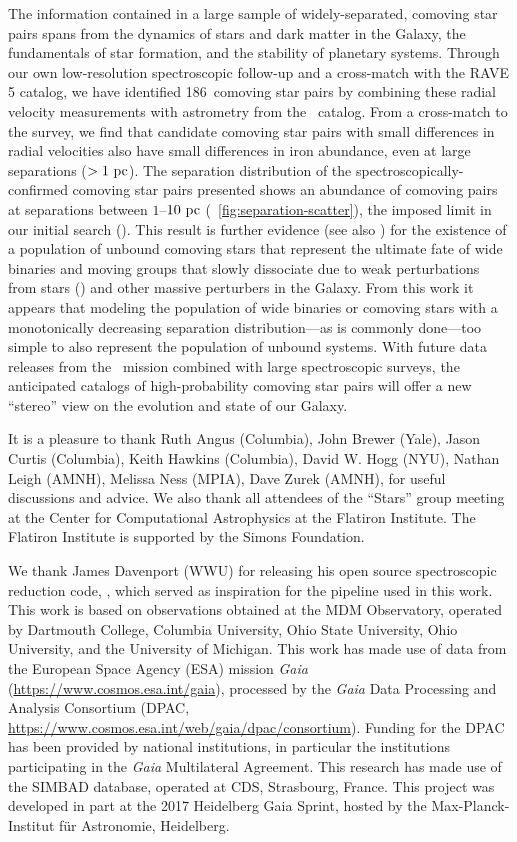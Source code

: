 \documentclass[modern, letterpaper]{aastex61}
\newcommand{\gaia}{\project{Gaia}}
\newcommand{\DR}[1]{\acronym{DR}#1}
\newcommand{\tgas}{\acronym{TGAS}}
\newcommand{\ncomovingtotal}{186}
\begin{document}
The information contained in a large sample of widely-separated, comoving star
pairs spans from the dynamics of stars and dark matter in the Galaxy, the
fundamentals of star formation, and the stability of planetary systems.
Through our own low-resolution spectroscopic follow-up and a cross-match with
the RAVE \DR{5} catalog, we have identified \ncomovingtotal\ comoving star pairs
by combining these radial velocity measurements with astrometry from the \tgas\
catalog.
From a cross-match to the  survey, we find that candidate
comoving star pairs with small differences in radial velocities also have small
differences in iron abundance, even at large separations ($>1~\mathrm{pc}$).
The separation distribution of the spectroscopically-confirmed comoving star
pairs presented shows an abundance of comoving pairs at separations between
$1$--$10~\mathrm{pc}$ (\figurename~\ref{fig:separation-scatter}), the imposed limit in
our initial search (\citealt{Oh:2017}).
This result is further evidence (see also \citealt{Shaya:2011}) for the
existence of a population of unbound comoving stars that represent the ultimate
fate of wide binaries and moving groups that slowly dissociate due to weak
perturbations from stars (\citealt{Jiang:2010}) and other massive perturbers in
the Galaxy.
From this work it appears that modeling the population of wide binaries or
comoving stars with a monotonically decreasing separation distribution---as is commonly done---too simple to also represent the population of unbound systems.
With future data releases from the \gaia\ mission combined with large
spectroscopic surveys, the anticipated catalogs of high-probability comoving
star pairs will offer a new ``stereo'' view on the evolution and state of our
Galaxy.

\acknowledgements

It is a pleasure to thank
Ruth Angus (Columbia),
John Brewer (Yale),
Jason Curtis (Columbia),
Keith Hawkins (Columbia),
David W. Hogg (NYU),
Nathan Leigh (AMNH),
Melissa Ness (MPIA),
Dave Zurek (AMNH),
for useful discussions and advice.
We also thank all attendees of the ``Stars'' group meeting at the Center for
Computational Astrophysics at the Flatiron Institute.
The Flatiron Institute is supported by the Simons Foundation.

We thank James Davenport (WWU) for releasing his open source spectroscopic
reduction code, \package{PyDIS}, which served as inspiration for the pipeline
used in this work.
This work is based on observations obtained at the MDM Observatory, operated by
Dartmouth College, Columbia University, Ohio State University, Ohio University,
and the University of Michigan.
This work has made use of data from the European Space Agency (ESA)
mission {\it Gaia} (\url{https://www.cosmos.esa.int/gaia}), processed by
the {\it Gaia} Data Processing and Analysis Consortium (DPAC,
\url{https://www.cosmos.esa.int/web/gaia/dpac/consortium}). Funding
for the DPAC has been provided by national institutions, in particular
the institutions participating in the {\it Gaia} Multilateral Agreement.
This research has made use of the SIMBAD database, operated at CDS, Strasbourg,
France.
This project was developed in part at the 2017 Heidelberg Gaia Sprint, hosted by
the Max-Planck-Institut f\"ur Astronomie, Heidelberg.
\end{document}
